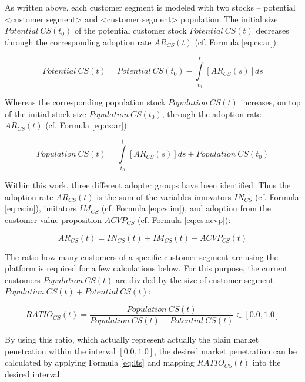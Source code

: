 As written above, each customer segment is modeled with two stocks -- potential <customer segment> and <customer segment> population. The initial size $\mathit{Potential~CS(t_0)}$ of the potential customer stock $\mathit{Potential~CS(t)}$ decreases through the corresponding adoption rate $AR_{CS}(t)$ (cf. Formula \ref{eq:cs:ar}):

\begin{equation}\label{eq:cs:pot}
	\mathit{Potential~CS(t)} =\mathit{Potential~CS(t_0)} - \int\limits_{t_0}^t  [AR_{CS}(s)]ds
\end{equation}

Whereas the corresponding population stock $\mathit{Population~CS(t)}$ increases, on top of the initial stock size $\mathit{Population~CS(t_0)}$, through the adoption rate $AR_{CS}(t)$ (cf. Formula \ref{eq:cs:ar}):

\begin{equation}\label{eq:cs:pop}
	\mathit{Population~CS(t)} = \int\limits_{t_0}^t [AR_{CS}(s)]ds + \mathit{Population~CS(t_0)}
\end{equation}

Within this work, three different adopter groups have been identified. Thus the adoption rate $AR_{CS}(t)$ is the sum of the variables innovators $IN_{CS}$ (cf. Formula \ref{eq:cs:in}), imitators $IM_{CS}$ (cf. Formula \ref{eq:cs:im}), and adoption from the customer value proposition $ACVP_{CS}$ (cf. Formula \ref{eq:cs:acvp}):

\begin{equation}\label{eq:cs:ar}
		AR_{CS}(t) = IN_{CS}(t) + IM_{CS}(t) + ACVP_{CS}(t)	
\end{equation}

The ratio how many customers of a specific customer segment are using the platform is required for a few calculations below. For this purpose, the current customers $\mathit{Population~CS(t)}$ are divided by the size of customer segment $\mathit{Population~CS(t)} + \mathit{Potential~CS(t)}$:

\begin{equation}\label{eq:cs:ratio}
		RATIO_{CS}(t) = \frac{\mathit{Population~CS(t)}}{\mathit{Population~CS(t)} + \mathit{Potential~CS(t)}} \in [0.0,1.0]
\end{equation}

By using this ratio, which actually represent actually the plain market penetration within the interval $[0.0,1.0]$, the desired market penetration can be calculated by applying Formula \ref{eq:lts} and mapping $RATIO_{CS}(t)$ into the desired interval:

